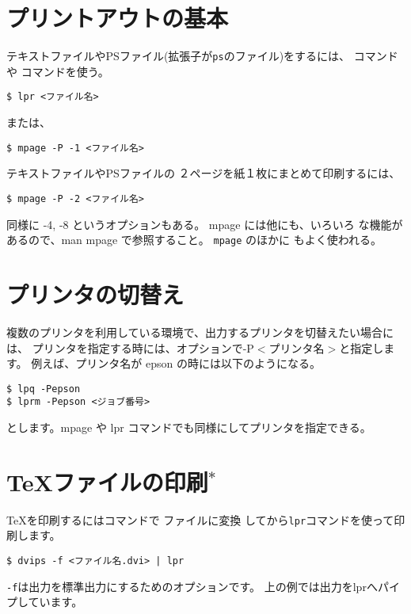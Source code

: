 \documentclass{jreport}
\begin{document}
\section{プリントアウトの基本}

テキストファイルやPSファイル(拡張子が\verb|ps|のファイル)をするには、
 コマンドや コマンドを使う。
\begin{screen}
\begin{verbatim}
$ lpr <ファイル名>
\end{verbatim}
\end{screen}
または、
\begin{screen}
\begin{verbatim}
$ mpage -P -1 <ファイル名>
\end{verbatim}
\end{screen}


テキストファイルやPSファイルの ２ページを紙１枚にまとめて印刷するには、
\begin{screen}
\begin{verbatim}
$ mpage -P -2 <ファイル名>
\end{verbatim}
\end{screen}
同様に -4, -8 というオプションもある。 mpage には他にも、いろいろ
な機能があるので、man mpage で参照すること。
\verb|mpage| のほかに  もよく使われる。

\section{プリンタの切替え}

複数のプリンタを利用している環境で、出力するプリンタを切替えたい場合に
は、
プリンタを指定する時には、オプションで{\ttfamily -P{$<$}プリンタ名{$>$}}と指定します。
例えば、プリンタ名が epson の時には以下のようになる。
\begin{screen}
\begin{verbatim}
$ lpq -Pepson
$ lprm -Pepson <ジョブ番号>
\end{verbatim}
\end{screen}

とします。mpage や lpr コマンドでも同様にしてプリンタを指定できる。



\section{\TeX ファイルの印刷$^*$}

\TeX を印刷するにはコマンドで ファイルに変換
してから\verb|lpr|コマンドを使って印刷します。
\begin{screen}
\begin{verbatim}
$ dvips -f <ファイル名.dvi> | lpr
\end{verbatim}
\end{screen}
\verb|-f|は出力を標準出力にするためのオプションです。
上の例では出力をlprへパイプしています。
\end{document}
